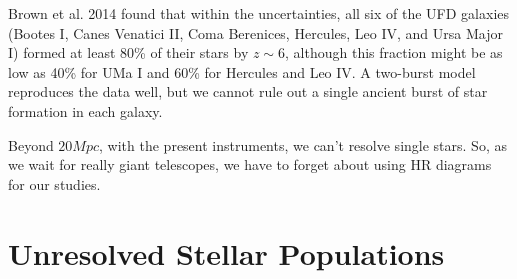 \par Brown et al. 2014 \cite{2014MmSAI..85..493B} found that within the uncertainties, all six of the UFD galaxies (Bootes I, Canes Venatici II, Coma Berenices, Hercules, Leo IV, and Ursa Major I) formed at least 80\% of their stars by $z\sim 6$, although this fraction might be as low as 40\% for UMa I and 60\% for Hercules and Leo IV. A two-burst model reproduces the data well, but we cannot rule out a single ancient burst of star formation in each galaxy.
\par Beyond $20\unit{Mpc}$, with the present instruments, we can’t resolve single stars. So, as we wait for really giant telescopes, we have to forget about using HR diagrams for our studies.

\section{Unresolved Stellar Populations}

